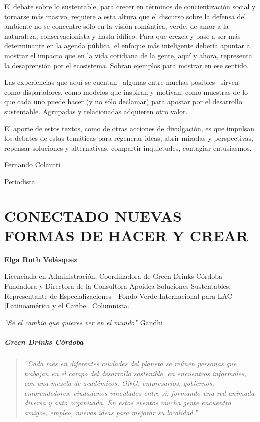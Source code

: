\documentclass[
]{article}
\begin{document}
El debate sobre lo sustentable, para crecer en términos de
concientización social y tornarse más masivo, requiere a esta altura que
el discurso sobre la defensa del ambiente no se concentre sólo en la
visión romántica, verde, de amor a la naturaleza, conservacionista y
hasta idílico. Para que crezca y pase a ser más determinante en la
agenda pública, el enfoque más inteligente debería apuntar a mostrar el
impacto que en la vida cotidiana de la gente, aquí y ahora, representa
la desaprensión por el ecosistema. Sobran ejemplos para mostrar en ese
sentido.

Las experiencias que aquí se cuentan --algunas entre muchas posibles--
sirven como disparadores, como modelos que inspiran y motivan, como
muestras de lo que cada uno puede hacer (y no sólo declamar) para
apostar por el desarrollo sustentable. Agrupadas y relacionadas
adquieren otro valor.

El aporte de estos textos, como de otras acciones de divulgación, es que
impulsan los debates de estas temáticas para regenerar ideas, abrir
miradas y perspectivas, repensar soluciones y alternativas, compartir
inquietudes, contagiar entusiasmos.

Fernando Colautti

Periodista

\newpage

\pagebreak
\clearpage
\cleardoublepage

\hypertarget{conectado-nuevas-formas-de-hacer-y-crear}{%
\section{CONECTADO NUEVAS FORMAS DE HACER Y
CREAR}\label{conectado-nuevas-formas-de-hacer-y-crear}}

\textbf{Elga Ruth Velásquez}

Licenciada en Administración, Coordinadora de Green Drinks Córdoba
Fundadora y Directora de la Consultora Apoidea Soluciones Sustentables.
Representante de Especializaciones - Fondo Verde Internacional para LAC
{[}Latinoamérica y el Caribe{]}. Columnista.

\emph{``Sé el cambio que quieres ver en el mundo''} Gandhi

\hypertarget{green-drinks-cuxf3rdoba}{%
\subparagraph{Green Drinks Córdoba}\label{green-drinks-cuxf3rdoba}}

\begin{quote}
\emph{``Cada mes en diferentes ciudades del planeta se reúnen personas
que trabajan en el campo del desarrollo sostenible, en encuentros
informales, con una mezcla de académicos, ONG, empresarios, gobiernos,
emprendedores, ciudadanos vinculados entre sí, formando una red animada
diversa y auto organizada. En estos eventos mucha gente encuentra
amigos, empleo, nuevas ideas para mejorar su localidad.''}
\end{quote}
\end{document}
